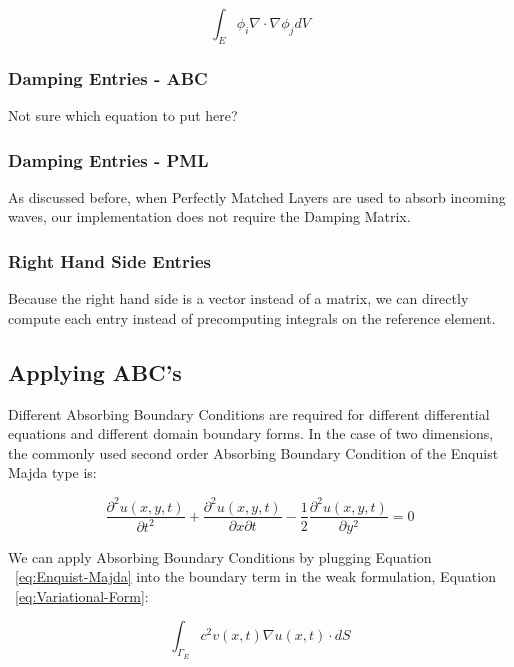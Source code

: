 \begin{equation}
\int_E \phi_i \nabla \cdot \nabla \phi_j dV
\end{equation}

\subsubsection{Damping Entries - ABC}

Not sure which equation to put here?

\subsubsection{Damping Entries - PML}

As discussed before, when Perfectly Matched Layers are used to absorb incoming waves, our implementation does not require the Damping Matrix.

\subsubsection{Right Hand Side Entries}

Because the right hand side is a vector instead of a matrix, we can directly compute each entry instead of precomputing integrals on the reference element.

\subsection{Applying ABC's}

Different Absorbing Boundary Conditions are required for different differential equations and different domain boundary forms. In the case of two dimensions, the commonly used second order Absorbing Boundary Condition of the Enquist Majda type is:

\begin{equation}
\frac{\partial^2 u(x,y,t)}{\partial t^2} + \frac{\partial^2 u(x,y,t)}{\partial x \partial t} - \frac{1}{2} \frac{\partial^2 u(x,y,t)}{\partial y^2} = 0
\label{eq:Enquist-Majda}
\end{equation}

We can apply Absorbing Boundary Conditions by plugging Equation ~\ref{eq:Enquist-Majda} into the boundary term in the weak formulation, Equation ~\ref{eq:Variational-Form}:

\begin{equation}
\int_{\Gamma_E} c^2 v(x,t) \nabla u(x,t) \cdot dS
\end{equation}



